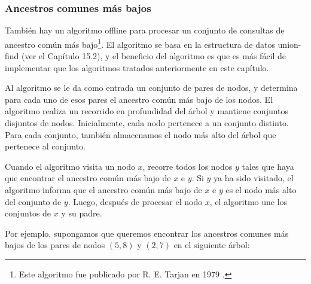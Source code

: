 \subsubsection{Ancestros comunes más bajos}

También hay un algoritmo offline
para procesar un conjunto de
consultas de ancestro común más bajo\footnote{Este
algoritmo fue publicado por R. E. Tarjan en 1979 \cite{tar79}.}.
El algoritmo se basa en la estructura de datos union-find
(ver el Capítulo 15.2), y el beneficio del algoritmo es
que es más fácil de implementar que los
algoritmos tratados anteriormente en este capítulo.

Al algoritmo se le da como entrada un conjunto de pares de nodos,
y determina para cada uno de esos pares el
ancestro común más bajo de los nodos.
El algoritmo realiza un recorrido en profundidad del árbol
y mantiene conjuntos disjuntos de nodos.
Inicialmente, cada nodo pertenece a un conjunto distinto.
Para cada conjunto, también almacenamos el nodo más alto del
árbol que pertenece al conjunto.

Cuando el algoritmo visita un nodo $x$,
recorre todos los nodos $y$ tales que
haya que encontrar el ancestro común más bajo
de $x$ e $y$.
Si $y$ ya ha sido visitado,
el algoritmo informa que el
ancestro común más bajo de $x$ e $y$
es el nodo más alto del conjunto de $y$.
Luego, después de procesar el nodo $x$,
el algoritmo une los conjuntos de $x$ y su padre.

Por ejemplo, supongamos que queremos encontrar los ancestros
comunes más bajos de los pares de nodos $(5,8)$
y $(2,7)$ en el siguiente árbol:
\begin{center}
\end{center}

